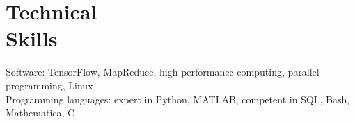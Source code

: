 \section{\sc Technical\\Skills} %
Software: TensorFlow, MapReduce, high performance computing, parallel programming, Linux\\ 
Programming languages: expert in Python, MATLAB; competent in SQL, Bash, Mathematica, C

